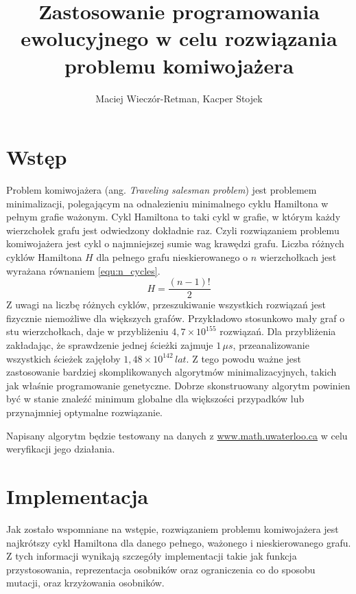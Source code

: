 \documentclass{article}
\title{Zastosowanie programowania ewolucyjnego w celu rozwiązania problemu
    komiwojażera}
\author{Maciej Wieczór-Retman, Kacper Stojek}
\date{} %
\begin{document}
\maketitle

\section{Wstęp}

Problem komiwojażera (ang. \textit{Traveling salesman problem}) jest problemem
minimalizacji, polegającym na odnalezieniu minimalnego cyklu Hamiltona w pełnym
grafie ważonym. Cykl Hamiltona to taki cykl w grafie, w którym każdy wierzchołek
grafu jest odwiedzony dokładnie raz. Czyli rozwiązaniem problemu komiwojażera
jest cykl o najmniejszej sumie wag krawędzi grafu. Liczba różnych cyklów
Hamiltona $H$ dla pełnego grafu nieskierowanego o $n$ wierzchołkach jest
wyrażana równaniem \cref{equ:n_cycles}.
\begin{equation}
    H = \frac{\left(n - 1\right)!}{2}
    \label{equ:n_cycles}
\end{equation}
Z uwagi na liczbę różnych cyklów, przeszukiwanie wszystkich rozwiązań jest
fizycznie niemożliwe dla większych grafów. Przykładowo stosunkowo mały graf o
stu wierzchołkach, daje w przybliżeniu $4,7 \times  10^{155}$ rozwiązań. Dla
przybliżenia zakładając, że sprawdzenie jednej ścieżki zajmuje $1 \, \mu s$,
przeanalizowanie wszystkich ścieżek zajęłoby $1,48 \times  10^{142} \, lat$.
Z tego powodu ważne jest zastosowanie bardziej skomplikowanych algorytmów
minimalizacyjnych, takich jak właśnie programowanie genetyczne. Dobrze
skonstruowany algorytm powinien być w stanie znaleźć minimum globalne dla
większości przypadków lub przynajmniej optymalne rozwiązanie.

Napisany algorytm będzie testowany na danych z
{\color{blue} \href{https://www.math.uwaterloo.ca/tsp/vlsi/index.html}
{www.math.uwaterloo.ca}} w celu weryfikacji jego działania.

\section{Implementacja}

Jak zostało wspomniane na wstępie, rozwiązaniem problemu komiwojażera jest
najkrótszy cykl Hamiltona dla danego pełnego, ważonego i nieskierowanego grafu.
Z tych informacji wynikają szczegóły implementacji takie jak funkcja
przystosowania, reprezentacja osobników oraz ograniczenia co do sposobu mutacji,
oraz krzyżowania osobników.
\end{document}
